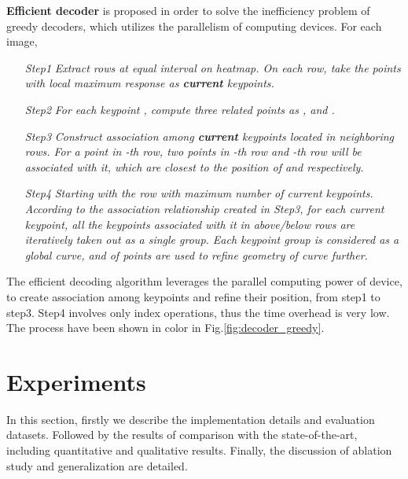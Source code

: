 \documentclass[final]{cvpr}
\begin{document}
\textbf{Efficient decoder} is proposed in order to solve the inefficiency problem of greedy decoders, which utilizes the parallelism of computing devices. For each image,
\begin{itemize}[itemindent=1em]
    \item [\textsl{Step1}]
        \textsl{Extract rows at equal interval  on heatmap. On each row, take the points with local maximum response as \textbf{current} keypoints.}
    
    \item [\textsl{Step2}]
        \textsl{For each keypoint , compute three related points as ,   and . }
    
    \item [\textsl{Step3}]
        \textsl{Construct association among \textbf{current} keypoints located in neighboring rows. For a point  in -th row, two points in -th row and -th row will be associated with it, which are closest to the position of  and  respectively.}
    
    \item [\textsl{Step4}]
        \textsl{Starting with the row with maximum number of current keypoints. According to the association relationship created in Step3, for each current keypoint, all the keypoints associated with it in above/below rows are iteratively taken out as a single group. Each keypoint group is considered as a global curve, and  of points are used to refine geometry of curve further.}
\end{itemize}
The efficient decoding algorithm leverages the parallel computing power of device, to create association among keypoints and refine their position, from step1 to step3. Step4 involves only index operations, thus the time overhead is very low. The process have been shown in color in Fig.\ref{fig:decoder_greedy}.








\thispagestyle{empty}
\section{Experiments}
In this section, firstly we describe the implementation details and evaluation datasets. Followed by the results of comparison with the state-of-the-art, including quantitative and qualitative results. Finally, the discussion of ablation study and generalization are detailed.
\end{document}

